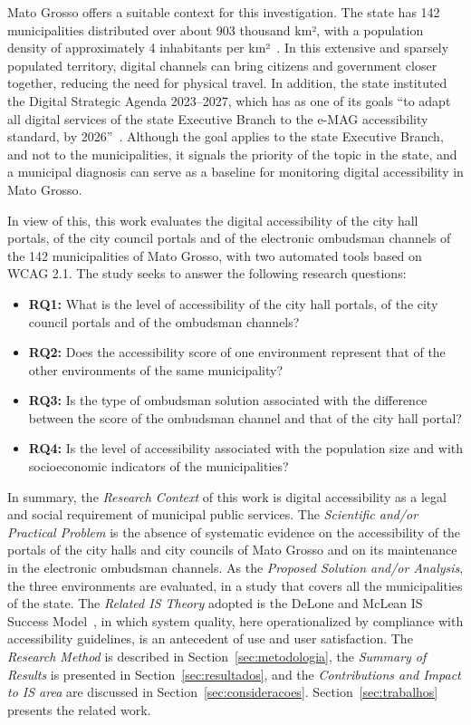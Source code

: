 \documentclass[12pt]{article}
\begin{document}
Mato Grosso offers a suitable context for this investigation. The state has 142 municipalities distributed over about 903 thousand km², with a population density of approximately 4 inhabitants per km²~\cite{ibgemt}. In this extensive and sparsely populated territory, digital channels can bring citizens and government closer together, reducing the need for physical travel. In addition, the state instituted the Digital Strategic Agenda 2023--2027, which has as one of its goals ``to adapt all digital services of the state Executive Branch to the e-MAG accessibility standard, by 2026''~\cite{matogrosso:2023}. Although the goal applies to the state Executive Branch, and not to the municipalities, it signals the priority of the topic in the state, and a municipal diagnosis can serve as a baseline for monitoring digital accessibility in Mato Grosso.

In view of this, this work evaluates the digital accessibility of the city hall portals, of the city council portals and of the electronic ombudsman channels of the 142 municipalities of Mato Grosso, with two automated tools based on WCAG 2.1. The study seeks to answer the following research questions:
\begin{itemize}
  \item \textbf{RQ1:} What is the level of accessibility of the city hall portals, of the city council portals and of the ombudsman channels?
  \item \textbf{RQ2:} Does the accessibility score of one environment represent that of the other environments of the same municipality?
  \item \textbf{RQ3:} Is the type of ombudsman solution associated with the difference between the score of the ombudsman channel and that of the city hall portal?
  \item \textbf{RQ4:} Is the level of accessibility associated with the population size and with socioeconomic indicators of the municipalities?
\end{itemize}

In summary, the \textit{Research Context} of this work is digital accessibility as a legal and social requirement of municipal public services. The \textit{Scientific and/or Practical Problem} is the absence of systematic evidence on the accessibility of the portals of the city halls and city councils of Mato Grosso and on its maintenance in the electronic ombudsman channels. As the \textit{Proposed Solution and/or Analysis}, the three environments are evaluated, in a study that covers all the municipalities of the state. The \textit{Related IS Theory} adopted is the DeLone and McLean IS Success Model~\cite{delone1992,delone2003}, in which system quality, here operationalized by compliance with accessibility guidelines, is an antecedent of use and user satisfaction. The \textit{Research Method} is described in Section~\ref{sec:metodologia}, the \textit{Summary of Results} is presented in Section~\ref{sec:resultados}, and the \textit{Contributions and Impact to IS area} are discussed in Section~\ref{sec:consideracoes}. Section~\ref{sec:trabalhos} presents the related work.
\end{document}
